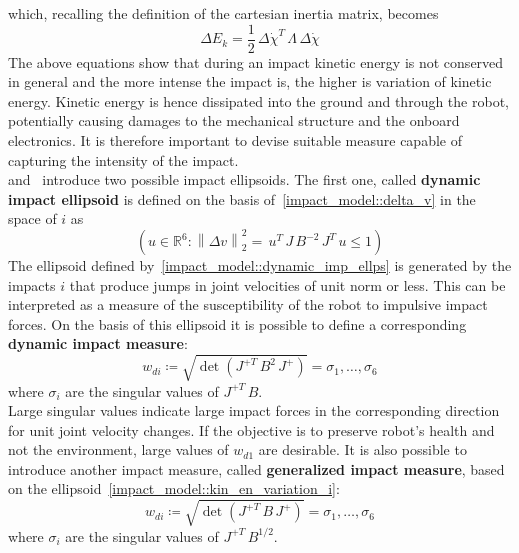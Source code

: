 \documentclass[letterpaper, 10 pt, conference]{ieeeconf}  %
\begin{document}
which, recalling the definition of the cartesian inertia matrix, becomes
\begin{equation}
\Delta E_k = \dfrac{1}{2}\,{\Delta\dot{\chi} }^T\,\Lambda\,\Delta\dot{\chi}
\end{equation}
The above equations show that during an impact kinetic energy is not conserved in general and the more intense the impact is, the higher is variation of kinetic energy. Kinetic energy is hence dissipated into the ground and through the robot, potentially causing damages to the mechanical structure and the onboard electronics. It is therefore important to devise suitable measure capable of  capturing the intensity of the impact.\\
\cite{impact_dyn::walker1994impact} and~\cite{impact_dyn::walker1990use} introduce two possible impact ellipsoids.
The first one, called \textbf{dynamic impact ellipsoid} is defined on the basis of~\eqref{impact_model::delta_v} in the space of $i$ as
\begin{equation}\label{impact_model::dynamic_imp_ellps}
(u\in\mathbb{R}^{6}: \left\lVert{\Delta v}\right\rVert^2_2 = \,u^T\,J\,B^{-2}\,J^T\,u \leq 1)
\end{equation}
The ellipsoid defined by~\eqref{impact_model::dynamic_imp_ellps} is generated by the impacts $i$ that produce jumps in joint velocities of unit norm or less. This can be interpreted as a measure of the susceptibility of the robot to impulsive impact forces. 
On the basis of this ellipsoid it is possible to define a corresponding \textbf{dynamic impact measure}:
\begin{equation}\label{impact_model::dynamic_imp_meas}
w_{di}\coloneqq \sqrt{\det{\left(J^{+T}\,B^2\,J^{+}\right)}} = \sigma_{1}, \dots, \sigma_{6}
\end{equation}
where $\sigma_i$ are the singular values of $J^{+T}\,B$.\\
Large singular values indicate large impact forces in the corresponding direction for unit joint velocity changes. If the objective is to preserve robot's health and not the environment, large values of $w_{d1}$ are desirable.
It is also possible to introduce another impact measure, called \textbf{generalized impact measure}, based on the ellipsoid~\eqref{impact_model::kin_en_variation_i}:
\begin{equation}\label{impact_model::gen_dynamic_imp_meas}
w_{di}\coloneqq \sqrt{\det{\left(J^{+T}\,B\,J^{+}\right)}} = \sigma_{1}, \dots, \sigma_{6}
\end{equation}
where $\sigma_i$ are the singular values of $J^{+T}\,B^{1/2}$.\\
\end{document}
